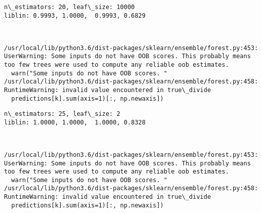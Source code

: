 \documentclass[10pt, t]{beamer}
\begin{document}
    \begin{Verbatim}[commandchars=\\\{\}]
n\_estimators: 20, leaf\_size: 10000
liblin: 0.9993, 1.0000,  0.9993, 0.6829 



    \end{Verbatim}

    \begin{Verbatim}[commandchars=\\\{\}]
/usr/local/lib/python3.6/dist-packages/sklearn/ensemble/forest.py:453: UserWarning: Some inputs do not have OOB scores. This probably means too few trees were used to compute any reliable oob estimates.
  warn("Some inputs do not have OOB scores. "
/usr/local/lib/python3.6/dist-packages/sklearn/ensemble/forest.py:458: RuntimeWarning: invalid value encountered in true\_divide
  predictions[k].sum(axis=1)[:, np.newaxis])

    \end{Verbatim}

    \begin{Verbatim}[commandchars=\\\{\}]
n\_estimators: 25, leaf\_size: 2
liblin: 1.0000, 1.0000,  1.0000, 0.8328 



    \end{Verbatim}

    \begin{Verbatim}[commandchars=\\\{\}]
/usr/local/lib/python3.6/dist-packages/sklearn/ensemble/forest.py:453: UserWarning: Some inputs do not have OOB scores. This probably means too few trees were used to compute any reliable oob estimates.
  warn("Some inputs do not have OOB scores. "
/usr/local/lib/python3.6/dist-packages/sklearn/ensemble/forest.py:458: RuntimeWarning: invalid value encountered in true\_divide
  predictions[k].sum(axis=1)[:, np.newaxis])

    \end{Verbatim}
\end{document}
